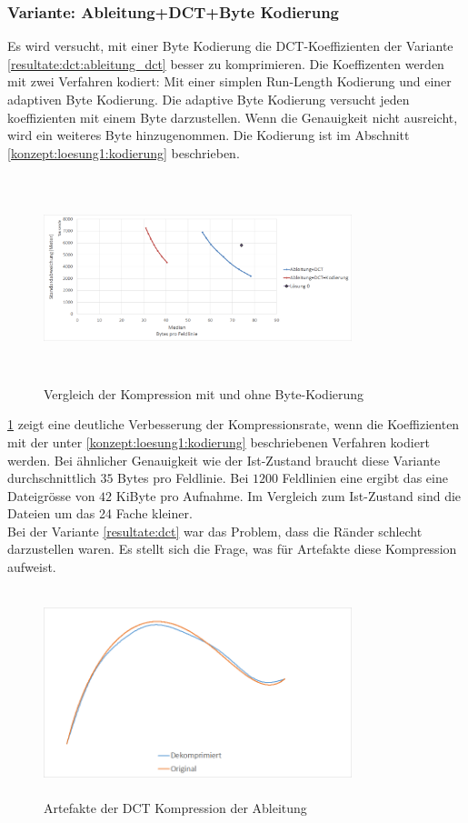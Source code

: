 \subsubsection{Variante: Ableitung+DCT+Byte Kodierung} \label{resultate:loesung1:ableitung_dct_kodierung}
Es wird versucht, mit einer Byte Kodierung die DCT-Koeffizienten der Variante \ref{resultate:dct:ableitung_dct} besser zu komprimieren. Die Koeffizenten werden mit zwei Verfahren kodiert: Mit einer simplen Run-Length Kodierung und einer adaptiven Byte Kodierung. Die adaptive Byte Kodierung versucht jeden koeffizienten mit einem Byte darzustellen. Wenn die Genauigkeit nicht ausreicht, wird ein weiteres Byte hinzugenommen. Die Kodierung ist im Abschnitt \ref{konzept:loesung1:kodierung} beschrieben.
\begin{figure}[!htbp]
	\center
	\includegraphics[width=0.8\textwidth,height=6cm,keepaspectratio]{./pictures/resultate/loesung1/loesung1-6/loesung1_6.png}
	\caption{Vergleich der Kompression mit und ohne Byte-Kodierung}
	\label{resultate:loesung1:dct:kodierung}
\end{figure}
\ref{resultate:loesung1:dct:kodierung} zeigt eine deutliche Verbesserung der Kompressionsrate, wenn die Koeffizienten mit der unter \ref{konzept:loesung1:kodierung} beschriebenen Verfahren kodiert werden. Bei ähnlicher Genauigkeit wie der Ist-Zustand braucht diese Variante durchschnittlich $35$ Bytes pro Feldlinie. Bei $1200$ Feldlinien eine ergibt das eine Dateigrösse von $42$ KiByte pro Aufnahme. Im Vergleich zum Ist-Zustand sind die Dateien um das 24 Fache kleiner.\\
[\baselineskip]
Bei der Variante \ref{resultate:dct} war das Problem, dass die Ränder schlecht darzustellen waren. Es stellt sich die Frage, was für Artefakte diese Kompression aufweist.
\begin{figure}[!htbp]
	\center
	\includegraphics[width=0.8\textwidth,height=6cm,keepaspectratio]{./pictures/resultate/loesung1/loesung1-6/artefakte.png}
	\caption{Artefakte der DCT Kompression der Ableitung}
	\label{resultate:loesung1:dct:byte:artefakte}
\end{figure} 
